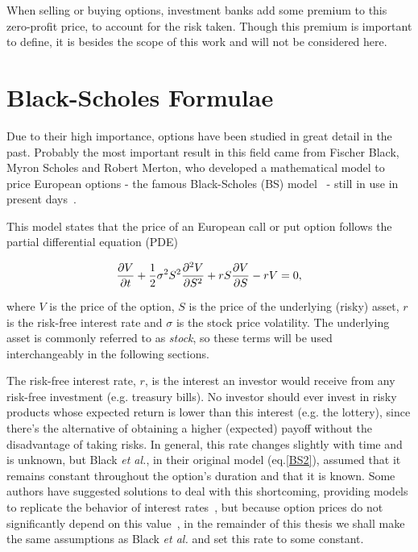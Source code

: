 When selling or buying options, investment banks add some premium to this zero-profit price, to account for the risk taken. Though this premium is important to define, it is besides the scope of this work and will not be considered here.
    
\section{Black-Scholes Formulae}
\label{section:Black-Scholes Formulae}
Due to their high importance, options have been studied in great detail in the past.
Probably the most important result in this field came from Fischer Black, Myron Scholes and Robert Merton, who developed a mathematical model to price European options - the famous Black-Scholes (BS) model~\cite{Scholes} - still in use in present days~\cite{Wilmott3}.

This model states that the price of an European call or put option follows the partial differential equation (PDE)

\begin{equation}\label{BS2}
\pdv{V}{t}+\frac{1}{2}\sigma^2S^2\pdv{^2V}{S^2}+rS\pdv{V}{S}-rV=0,
\end{equation}

\noindent where $V$ is the price of the option, $S$ is the price of the underlying (risky) asset, $r$ is the risk-free interest rate and $\sigma$ is the stock price volatility.
The underlying asset is commonly referred to as \emph{stock}, so these terms will be used interchangeably in the following sections.


The risk-free interest rate, $r$, is the interest an investor would receive from any risk-free investment (e.g. treasury bills). No investor should ever invest in risky products whose expected return is lower than this interest (e.g. the lottery), since there's the alternative of obtaining a higher (expected) payoff without the disadvantage of taking risks. In general, this rate changes slightly with time and is unknown, but Black \textit{et al.}, in their original model (eq.\eqref{BS2}), assumed that it remains constant throughout the option's duration and that it is known. Some authors have suggested solutions to deal with this shortcoming, providing models to replicate the behavior of interest rates~\cite{HJM}, but because option prices do not significantly depend on this value~\cite{Wilmott3}, in the remainder of this thesis we shall make the same assumptions as Black \textit{et al.} and set this rate to some constant.

